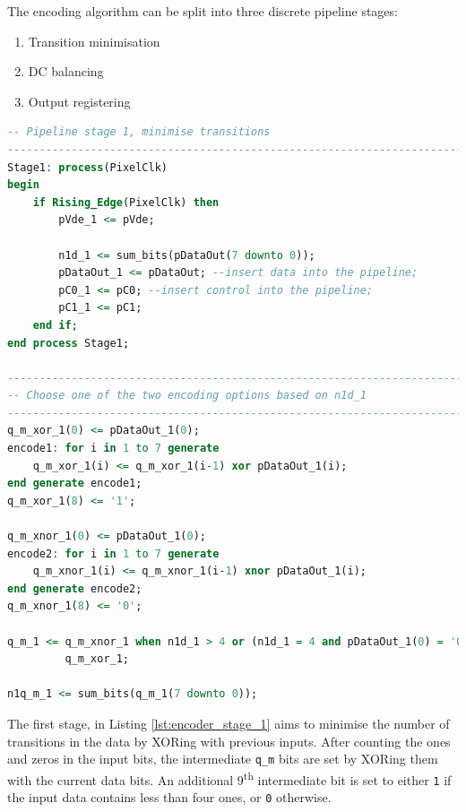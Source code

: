 The encoding algorithm can be split into three discrete pipeline stages:
\begin{enumerate}
    \item Transition minimisation
    \item DC balancing
    \item Output registering
\end{enumerate}

\begin{lstlisting}[caption={TMDS encoder transition minimisation stage.}, label={lst:encoder_stage_1}, language=VHDL]
-- Pipeline stage 1, minimise transitions
--------------------------------------------------------------------------
Stage1: process(PixelClk)
begin
    if Rising_Edge(PixelClk) then
        pVde_1 <= pVde;

        n1d_1 <= sum_bits(pDataOut(7 downto 0));
        pDataOut_1 <= pDataOut; --insert data into the pipeline;
        pC0_1 <= pC0; --insert control into the pipeline;
        pC1_1 <= pC1;
    end if;
end process Stage1;

--------------------------------------------------------------------------
-- Choose one of the two encoding options based on n1d_1
--------------------------------------------------------------------------
q_m_xor_1(0) <= pDataOut_1(0);
encode1: for i in 1 to 7 generate
    q_m_xor_1(i) <= q_m_xor_1(i-1) xor pDataOut_1(i);
end generate encode1;
q_m_xor_1(8) <= '1';

q_m_xnor_1(0) <= pDataOut_1(0);
encode2: for i in 1 to 7 generate
    q_m_xnor_1(i) <= q_m_xnor_1(i-1) xnor pDataOut_1(i);
end generate encode2;
q_m_xnor_1(8) <= '0';

q_m_1 <= q_m_xnor_1 when n1d_1 > 4 or (n1d_1 = 4 and pDataOut_1(0) = '0') else
         q_m_xor_1;

n1q_m_1 <= sum_bits(q_m_1(7 downto 0));
\end{lstlisting}

The first stage, in Listing \ref{lst:encoder_stage_1} aims to minimise the number of transitions in the data by XORing with previous inputs. After counting the ones and zeros in the input bits, the intermediate \texttt{q\_m} bits are set by XORing them with the current data bits. An additional 9\textsuperscript{th} intermediate bit is set to either \texttt{1} if the input data contains less than four ones, or \texttt{0} otherwise.

